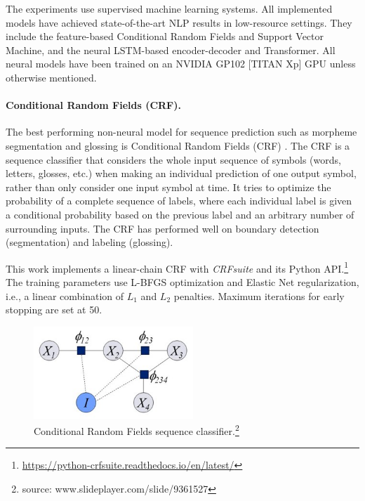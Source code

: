 The experiments use supervised machine learning systems. All implemented models have achieved state-of-the-art NLP results in low-resource settings. They include the feature-based Conditional Random Fields and Support Vector Machine, and the neural LSTM-based encoder-decoder and Transformer. All neural models have been trained on an NVIDIA GP102 [TITAN Xp] GPU unless otherwise mentioned.

\paragraph{Conditional Random Fields (CRF).} The best performing non-neural model for sequence prediction such as morpheme segmentation and glossing is Conditional Random Fields (CRF) \citep{lafferty_conditional_2001,muller_efficient_2013,ruokolainen_comparative_2016}. The CRF is a sequence classifier that considers the whole input sequence of symbols (words, letters, glosses, etc.) when making an individual prediction of one output symbol, rather than only consider one input symbol at time. It tries to optimize the probability of a complete sequence of labels, where each individual label is given a conditional probability based on the previous label and an arbitrary number of surrounding inputs. %
The CRF has performed well on boundary detection (segmentation) and labeling (glossing). 

This work implements a linear-chain CRF \citep{lafferty_conditional_2001} with \textit{CRFsuite} \citep{okazaki2007} and its Python API.\footnote{\url{https://python-crfsuite.readthedocs.io/en/latest/}} The training parameters use L-BFGS optimization \citep{liu1989} and Elastic Net regularization, i.e., a linear combination of $L_1$ and $L_2$ penalties. Maximum iterations for early stopping are set at 50.


\begin{figure}
    \centering
    \includegraphics[width=6cm]{figs/CRF.jpg}
    \caption[Conditional Random Fields]{Conditional Random Fields sequence classifier.\footnote{source: www.slideplayer.com/slide/9361527}}
    \label{fig:CRF}
\end{figure}


